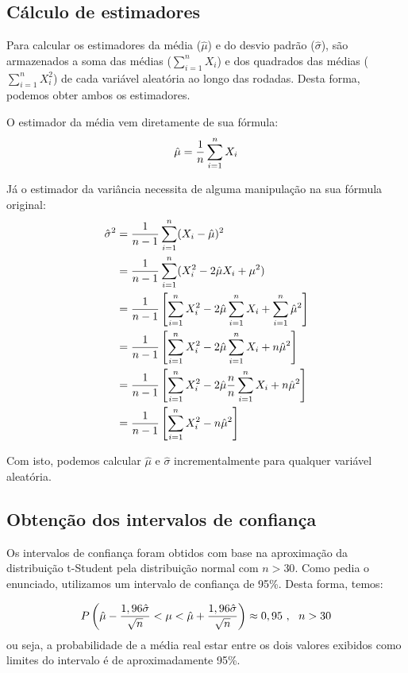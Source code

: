\documentclass[a4paper,10pt]{article}
\begin{document}
\subsection{Cálculo de estimadores}

Para calcular os estimadores da média ($\hat{\mu}$) e do desvio padrão ($\hat{\sigma}$), são armazenados a soma das médias ($\sum_{i = 1}^n X_i$) e dos quadrados das médias ($\sum_{i = 1}^n X_ i^2$) de cada variável aleatória ao longo das rodadas. Desta forma, podemos obter ambos os estimadores.

O estimador da média vem diretamente de sua fórmula:
\begin{equation}\label{estimadorMedia}
	\hat{\mu} = {{1} \over {n}} \sum_{i = 1}^n X_i
\end{equation}

Já o estimador da variância necessita de alguma manipulação na sua fórmula original:
\begin{align}
	\hat{\sigma}^2 &= {{1} \over {n - 1}} \sum_{i = 1}^n (X_i - \hat{\mu})^2 \\
	&= {{1} \over {n - 1}} \sum_{i = 1}^n (X_i^2 - 2 \hat{\mu} X_i + \mu^2) \\
	&= {{1} \over {n - 1}} \left[ \sum_{i = 1}^n X_i^2 - 2 \hat{\mu} \sum_{i = 1}^n X_i + \sum_{i = 1}^n \hat{\mu}^2 \right] \\
	&= {{1} \over {n - 1}} \left[ \sum_{i = 1}^n X_i^2 - 2 \hat{\mu} \sum_{i = 1}^n X_i + n \hat{\mu}^2 \right] \\
	&= {{1} \over {n - 1}} \left[ \sum_{i = 1}^n X_i^2 - 2 \hat{\mu} {{n}\over{n}} \sum_{i = 1}^n X_i + n \hat{\mu}^2 \right] \\
	&= {{1} \over {n - 1}} \left[ \sum_{i = 1}^n X_i^2 - n \hat{\mu}^2 \right]
\end{align}

Com isto, podemos calcular $\hat{\mu}$ e $\hat{\sigma}$ incrementalmente para qualquer variável aleatória.

\subsection{Obtenção dos intervalos de confiança}

Os intervalos de confiança foram obtidos com base na aproximação da distribuição t-Student pela distribuição normal com $n > 30$. Como pedia o enunciado, utilizamos um intervalo de confiança de 95\%. Desta forma, temos:

\begin{equation}
	P \left (\hat{\mu} - {{1,96 \hat{\sigma}} \over {\sqrt{n}}} < \mu < \hat{\mu} + {{1,96 \hat{\sigma}} \over {\sqrt{n}}} \right) \approx 0,95  ~,~~n > 30
\end{equation}
ou seja, a probabilidade de a média real estar entre os dois valores exibidos como limites do intervalo é de aproximadamente 95\%.
\end{document}
